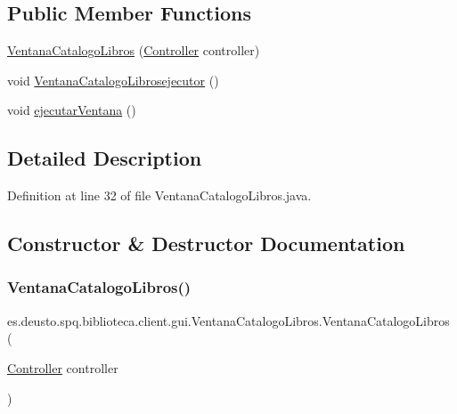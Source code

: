 \subsection*{Public Member Functions}
\begin{DoxyCompactItemize}
\item 
\mbox{\hyperlink{classes_1_1deusto_1_1spq_1_1biblioteca_1_1client_1_1gui_1_1_ventana_catalogo_libros_ad3299c3f43b2d7df44242a0db622f313}{Ventana\+Catalogo\+Libros}} (\mbox{\hyperlink{classes_1_1deusto_1_1spq_1_1biblioteca_1_1controller_1_1_controller}{Controller}} controller)
\item 
void \mbox{\hyperlink{classes_1_1deusto_1_1spq_1_1biblioteca_1_1client_1_1gui_1_1_ventana_catalogo_libros_a269ed9764cf7fde7566c875b100ae4de}{Ventana\+Catalogo\+Librosejecutor}} ()
\item 
void \mbox{\hyperlink{classes_1_1deusto_1_1spq_1_1biblioteca_1_1client_1_1gui_1_1_ventana_catalogo_libros_af65b1282e021cad1b3502774d5269674}{ejecutar\+Ventana}} ()
\end{DoxyCompactItemize}


\subsection{Detailed Description}


Definition at line 32 of file Ventana\+Catalogo\+Libros.\+java.



\subsection{Constructor \& Destructor Documentation}
\mbox{\label{classes_1_1deusto_1_1spq_1_1biblioteca_1_1client_1_1gui_1_1_ventana_catalogo_libros_ad3299c3f43b2d7df44242a0db622f313}} 
\subsubsection{\texorpdfstring{Ventana\+Catalogo\+Libros()}{VentanaCatalogoLibros()}}
{\footnotesize\ttfamily es.\+deusto.\+spq.\+biblioteca.\+client.\+gui.\+Ventana\+Catalogo\+Libros.\+Ventana\+Catalogo\+Libros (\begin{DoxyParamCaption}\item[{\mbox{\hyperlink{classes_1_1deusto_1_1spq_1_1biblioteca_1_1controller_1_1_controller}{Controller}}}]{controller }\end{DoxyParamCaption})}

